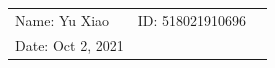 \documentclass{article}
\begin{document}
\begin{spacing}{2.0}
\vspace*{0.25cm}
\hrulefill
\thispagestyle{empty}
\begin{center}
\begin{large}
\end{large}

\hrulefill


\vspace*{5cm}
\begin{Large}
\end{Large}
\vspace{2em}
\end{center}
\vfill

\begin{table}[h!]
\flushleft
\begin{tabular}{lll}
Name: Yu Xiao \hspace*{2em}&
ID: 518021910696 \hspace*{2em}\\

Date: Oct 2, 2021
\end{tabular}
\end{table}
\end{spacing}

\hfill

\newpage
\end{document}
